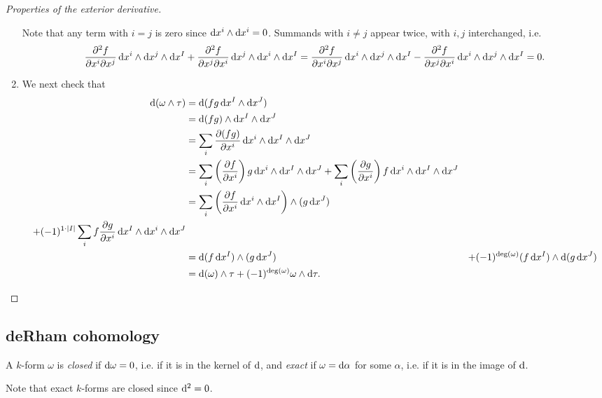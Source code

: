 \begin{proof}[Properties of the exterior derivative]
\begin{enumerate}
{      Note that any term with $i = j$ is zero since
      $\mathop{}\!\mathrm{d} x^i \wedge \mathop{}\!\mathrm{d} x^i = 0$. Summands with $i \neq j$
      appear twice, with $i, j$ interchanged, i.e.
      $$
        \frac{\partial^2 f}
             {\partial x^i \partial x^j}
           \dif x^i \wedge \dif x^j \wedge \dif x^I
      + \frac{\partial^2 f}
             {\partial x^j \partial x^i}
           \dif x^j \wedge \dif x^i \wedge \dif x^I
      = \frac{\partial^2 f}
             {\partial x^i \partial x^j}
           \dif x^i \wedge \dif x^j \wedge \dif x^I
      - \frac{\partial^2 f}
             {\partial x^j \partial x^i}
           \dif x^i \wedge \dif x^j \wedge \dif x^I
      = 0.
      $$
    }
    \item{
      We next check that
      \begin{align*}
         \dif (\omega \wedge \tau)
      &= \dif (f g \dif x^I \wedge \dif x^J) \\
      &= \dif (f g) \wedge \dif x^I \wedge \dif x^J \\
      &= \sum_i
            \frac{\partial (fg)}
                 {\partial x^i}
            \dif x^i \wedge \dif x^I \wedge \dif x^J \\
      &= \sum_i
            \left(
              \frac{\partial f}
                   {\partial x^i}
            \right)
            g
            \dif x^i \wedge \dif x^I \wedge \dif x^J
       + \sum_i
            \left(
              \frac{\partial g}
                   {\partial x^i}
            \right)
            f
            \dif x^i \wedge \dif x^I \wedge \dif x^J \\
      &= \sum_i
           \left(
             \frac{\partial f}
                  {\partial x^i}
             \dif x^i \wedge \dif x^I
           \right)
           \wedge (g \dif x^J) \\
       + (-1)^{1 \cdot |I|}
           \sum_i
             f \frac{\partial g}{\partial x^i}
             \dif x^I \wedge \dif x^i \wedge \dif x^J \\
      &= \dif (f \dif x^I) \wedge (g \dif x^J)
      &+ (-1)^{\deg(\omega)} (f \dif x^I) \wedge \dif(g \dif x^J) \\
      &= \dif (\omega) \wedge \tau
       + (-1)^{\deg(\omega)} \omega \wedge \dif \tau.
      \end{align*}
    }
  \end{enumerate}
\end{proof}

\subsection{deRham cohomology}
\begin{defn}
A $k$-form $\omega$ is \emph{closed} if
$\mathop{}\!\mathrm{d} \omega = 0$, i.e. if it is in the kernel of
$\mathop{}\!\mathrm{d}$, and \emph{exact} if
$\omega = \mathop{}\!\mathrm{d} \alpha$ for some $\alpha$, i.e. if it is in the image
of $\mathop{}\!\mathrm{d}$.
\end{defn}
Note that exact $k$-forms are closed since $\mathop{}\!\mathrm{d}^2 = 0$.

